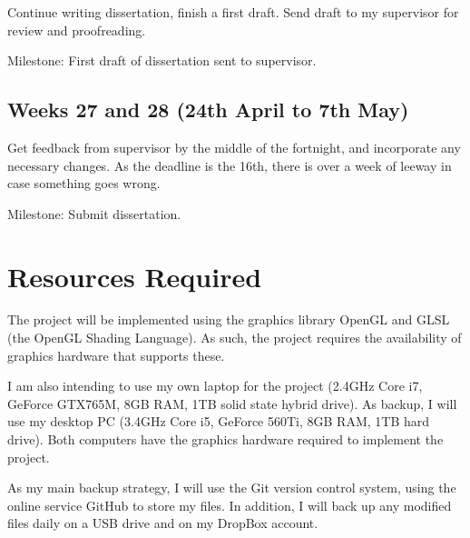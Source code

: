 \documentclass[12pt]{article}
\begin{document}
Continue writing dissertation, finish a first draft. Send draft to my supervisor for review and proofreading.

Milestone: First draft of dissertation sent to supervisor.

\subsection*{Weeks 27 and 28 (24th April to 7th May)}

Get feedback from supervisor by the middle of the fortnight, and incorporate any necessary changes. As the deadline is the 16th, there is over a week of leeway in case something goes wrong.

Milestone: Submit dissertation.

\section*{Resources Required}

The project will be implemented using the graphics library OpenGL and GLSL (the OpenGL Shading Language). As such, the project requires the availability of graphics hardware that supports these.

I am also intending to use my own laptop for the project (2.4GHz Core i7, GeForce GTX765M, 8GB RAM, 1TB solid state hybrid drive). As backup, I will use my desktop PC (3.4GHz Core i5, GeForce 560Ti, 8GB RAM, 1TB hard drive). Both computers have the graphics hardware required to implement the project.

As my main backup strategy, I will use the Git version control system, using the online service GitHub to store my files. In addition, I will back up any modified files daily on a USB drive and on my DropBox account.
\end{document}
